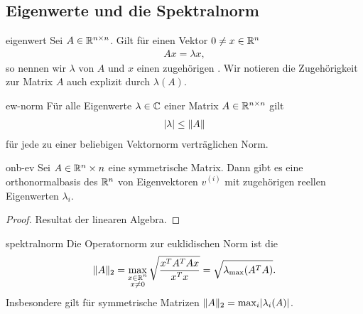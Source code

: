 \subsection{Eigenwerte und die Spektralnorm}

\begin{Definition}{eigenwert}
  Sei $A\in \mathbb R^{n\times n}$. Gilt für einen Vektor $0\neq x\in \mathbb R^n$
  \begin{gather}
    Ax = \lambda x,
  \end{gather}
  so nennen wir $\lambda$  von $A$ und $x$ einen
  zugehörigen . Wir notieren die Zugehörigkeit zur
  Matrix $A$ auch explizit durch $\lambda(A)$.
\end{Definition}

\begin{Lemma}{ew-norm}
  Für alle Eigenwerte $\lambda\in\mathbb C$ einer Matrix $A\in\mathbb R^{n\times n}$ gilt
  \begin{gather}
    \lvert\lambda\rvert \le \lVert A\rVert
  \end{gather}
  für jede zu einer beliebigen Vektornorm verträglichen Norm.
\end{Lemma}

\begin{Satz}{onb-ev}
  Sei $A\in \mathbb R^n\times n$ eine symmetrische Matrix. Dann gibt es eine
  orthonormalbasis des $\mathbb R^n$ von Eigenvektoren $v^{(i)}$ mit zugehörigen
  reellen Eigenwerten $\lambda_i$.
\end{Satz}

\begin{proof}
  Resultat der linearen Algebra.
\end{proof}

\begin{Satz}{spektralnorm}
  Die Operatornorm zur euklidischen Norm ist
  die 
  \begin{gather}
    \lVert A\rVert_2 = \max_{\substack{x\in\mathbb R^n\\x\neq0}}
    \sqrt{\frac{x^TA^TAx}{x^Tx}} = \sqrt{\lambda_{\max}(A^TA)}.
  \end{gather}
  Insbesondere gilt für symmetrische Matrizen
  $\lVert A\rVert_2 = \max_i\lvert\lambda_i(A)\rvert$.
\end{Satz}

